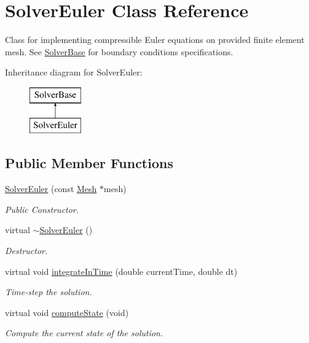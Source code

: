 \hypertarget{class_solver_euler}{}\section{Solver\+Euler Class Reference}
\label{class_solver_euler}


Class for implementing compressible Euler equations on provided finite element mesh. See \mbox{\hyperlink{class_solver_base}{Solver\+Base}} for boundary conditions specifications.  


Inheritance diagram for Solver\+Euler\+:\begin{figure}[H]
\begin{center}
\leavevmode
\includegraphics[height=2.000000cm]{class_solver_euler}
\end{center}
\end{figure}
\subsection*{Public Member Functions}
\begin{DoxyCompactItemize}
\item 
\mbox{\hyperlink{class_solver_euler_a636fce8aa919afe62be090e99d9346bf}{Solver\+Euler}} (const \mbox{\hyperlink{class_mesh}{Mesh}} $\ast$mesh)
\begin{DoxyCompactList}\small\item\em Public Constructor. \end{DoxyCompactList}\item 
virtual \mbox{\hyperlink{class_solver_euler_a16777db2c518c46a6c41f5437376e479}{$\sim$\+Solver\+Euler}} ()
\begin{DoxyCompactList}\small\item\em Destructor. \end{DoxyCompactList}\item 
virtual void \mbox{\hyperlink{class_solver_euler_a64caa7276a35f9e5408bec75bc2d3189}{integrate\+In\+Time}} (double current\+Time, double dt)
\begin{DoxyCompactList}\small\item\em Time-\/step the solution. \end{DoxyCompactList}\item 
virtual void \mbox{\hyperlink{class_solver_euler_a5aa41447d61bd488d39ad12f97022473}{compute\+State}} (void)
\begin{DoxyCompactList}\small\item\em Compute the current state of the solution. \end{DoxyCompactList}\end{DoxyCompactItemize}


